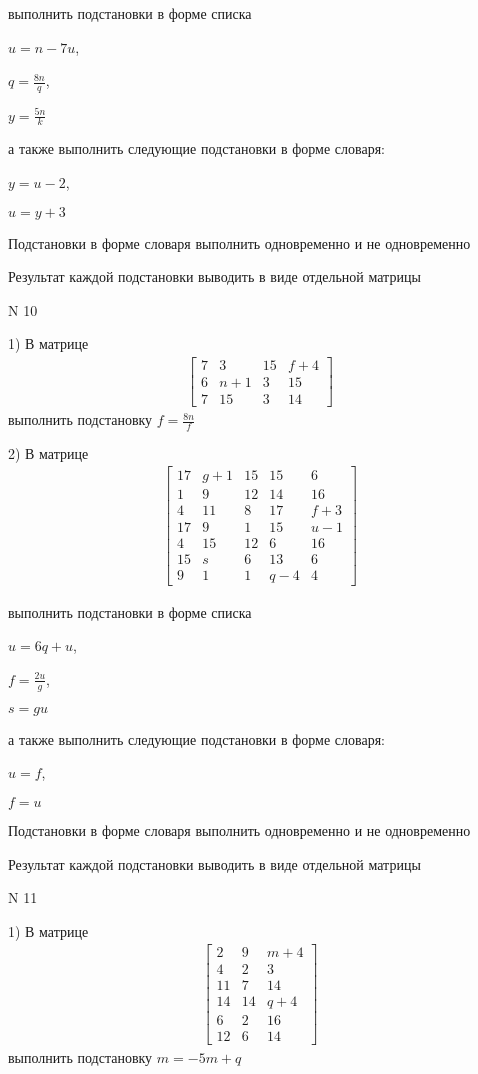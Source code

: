 \documentclass[11pt]{report}
\begin{document}
выполнить подстановки в форме списка

$u=n - 7 u$,

$q=\frac{8 n}{q}$,

$y=\frac{5 n}{k}$

а также выполнить следующие подстановки в форме словаря:

$y=u - 2$,

$u=y + 3$


    Подстановки в форме словаря выполнить одновременно и не одновременно


    Результат каждой подстановки выводить в виде отдельной матрицы

\newpage
N 10


    1) В матрице
\begin{align*}
\left[\begin{matrix}7 & 3 & 15 & f + 4\\6 & n + 1 & 3 & 15\\7 & 15 & 3 & 14\end{matrix}\right]
\end{align*}
выполнить подстановку $f=\frac{8 n}{f}$


    2) В матрице
\begin{align*}
\left[\begin{matrix}17 & g + 1 & 15 & 15 & 6\\1 & 9 & 12 & 14 & 16\\4 & 11 & 8 & 17 & f + 3\\17 & 9 & 1 & 15 & u - 1\\4 & 15 & 12 & 6 & 16\\15 & s & 6 & 13 & 6\\9 & 1 & 1 & q - 4 & 4\end{matrix}\right]
\end{align*}

выполнить подстановки в форме списка

$u=6 q + u$,

$f=\frac{2 u}{g}$,

$s=g u$

а также выполнить следующие подстановки в форме словаря:

$u=f$,

$f=u$


    Подстановки в форме словаря выполнить одновременно и не одновременно


    Результат каждой подстановки выводить в виде отдельной матрицы

\newpage
N 11


    1) В матрице
\begin{align*}
\left[\begin{matrix}2 & 9 & m + 4\\4 & 2 & 3\\11 & 7 & 14\\14 & 14 & q + 4\\6 & 2 & 16\\12 & 6 & 14\end{matrix}\right]
\end{align*}
выполнить подстановку $m=- 5 m + q$
\end{document}
